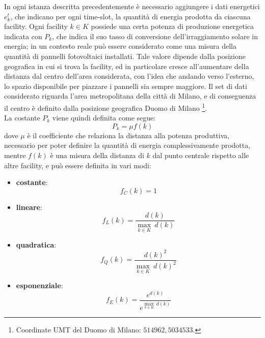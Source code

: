 In ogni istanza descritta precedentemente è necessario aggiungere i dati energetici $e^t_k$, che indicano per ogni time-slot, la quantità di energia prodotta da ciascuna facility. Ogni facility $k \in K$ possiede una certa potenza di produzione energetica indicata con $P_k$, che indica il suo tasso di conversione dell'irraggiamento solare in energia; in un contesto reale può essere considerato come una misura della quantità di pannelli fotovoltaici installati. Tale valore dipende dalla posizione geografica in cui si trova la facility, ed in particolare cresce all'aumentare della distanza dal centro dell'area considerata, con l'idea che andando verso l'esterno, lo spazio disponibile per piazzare i pannelli sia sempre maggiore. Il set di dati considerato riguarda l'area metropolitana della città di Milano, e di conseguenza il centro è definito dalla posizione geografica Duomo di Milano \footnote{Coordinate UMT del Duomo di Milano: $514962, 5034533$.}.\\
La costante $P_k$ viene quindi definita come segue:
\begin{equation}
    P_k = \mu f(k)
\end{equation}
dove $\mu$ è il coefficiente che relaziona la distanza alla potenza produttiva, necessario per poter definire la quantità di energia complessivamente prodotta, mentre $f(k)$ è una misura della distanza di $k$ dal punto centrale rispetto alle altre facility, e può essere definita in vari modi:
\begin{itemize}
    \item \textbf{costante}:
    \begin{equation}
        f_C(k) = 1
        \label{eq:fC}
    \end{equation}

    \item \textbf{lineare}:
    \begin{equation}
        f_L(k) = \frac{d(k)}{\underset{k \in K}{\max} ~ d(k)}
        \label{eq:fL}
    \end{equation}

    \item \textbf{quadratica}:
    \begin{equation}
        f_Q(k) = \frac{d(k)^2}{\underset{k \in K}{\max} ~ d(k)^2}
        \label{eq:fQ}
    \end{equation}

    \item \textbf{esponenziale}:
    \begin{equation}
        f_E(k) = \frac{e^{d(k)}}{e^{\underset{k \in K}{\max} ~ d(k)}}
        \label{eq:fE}
    \end{equation}
\end{itemize}
